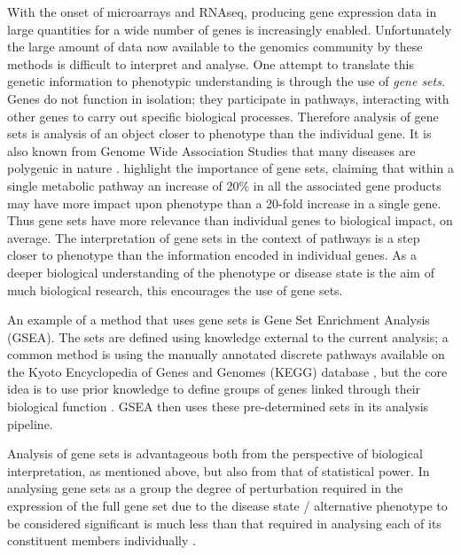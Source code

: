 \documentclass[14pt]{extarticle} %
\begin{document}
	With the onset of microarrays and RNAseq, producing gene expression data in large quantities for a wide number of genes is increasingly enabled. Unfortunately the large amount of data now available to the genomics community by these methods is difficult to interpret and analyse. One attempt to translate this genetic information to phenotypic understanding is through the use of \emph{gene sets}. Genes do not function in isolation; they participate in pathways, interacting with other genes to carry out specific biological processes. Therefore analysis of gene sets is analysis of an object closer to phenotype than the individual gene. It is also known from Genome Wide Association Studies that many diseases are polygenic in nature \citep{MooneyGenesetanalysis2015}. \citet{SubramanianGenesetenrichment2005a} highlight the importance of gene sets, claiming that within a single metabolic pathway an increase of $20\%$ in all the associated gene products may have more impact upon phenotype than a 20-fold increase in a single gene.  Thus gene sets have more relevance than individual genes to biological impact, on average. The interpretation of gene sets in the context of pathways is a step closer to phenotype than the information encoded in individual genes. As a deeper biological understanding of the phenotype or disease state is the aim of much biological research, this encourages the use of gene sets.
	
	An example of a method that uses gene sets is Gene Set Enrichment Analysis (GSEA). The sets are defined using knowledge external to the current analysis; a common method is using the manually annotated discrete pathways available on the Kyoto Encyclopedia of Genes and Genomes (KEGG) database \citep{FridleyGenesetanalysis2011}, but the core idea is to use prior knowledge to define groups of genes linked through their biological function \citep{HejblumTimeCourseGeneSet2015}. GSEA then uses these pre-determined sets in its analysis pipeline.
	
	Analysis of gene sets is advantageous both from the perspective of biological interpretation, as mentioned above, but also from that of statistical power. In analysing gene sets as a group the degree of perturbation required in the expression of the full gene set due to the disease state / alternative phenotype to be considered significant is much less than that required in analysing each of its constituent members individually \citep{DudbridgePowerPredictiveAccuracy2013, WrayResearchReviewPolygenic2014, MooneyGenesetanalysis2015}.
	
\end{document}
